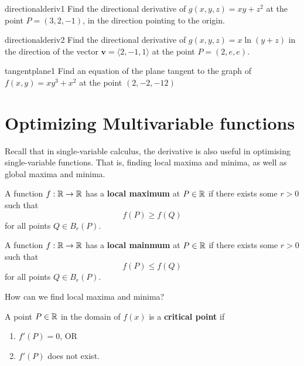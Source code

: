\begin{problem}{directionalderiv1}
    Find the directional derivative of $g(x,y,z) = xy+z^2$ at the point $P = (3,2,-1)$, in the direction pointing to the origin.
\end{problem}

\begin{problem}{directionalderiv2}
    Find the directional derivative of $g(x,y,z) = x\ln(y+z)$ in the direction of the vector $\bm{v} = \langle 2, -1, 1 \rangle$ at the point $P = (2,e,e)$.
\end{problem}


\begin{problem}{tangentplane1}
    Find an equation of the plane tangent to the graph of $f(x,y) = xy^3 + x^2$ at the point $(2,-2,-12)$
\end{problem}

\section{Optimizing Multivariable functions}

Recall that in single-variable calculus, the derivative is also useful in optimising single-variable functions.  That is, finding local maxima and minima, as well as global maxima and minima.  

\begin{definition}
    A function $f: \mathbb{R} \to \mathbb{R}$ has a \textbf{local maximum} at $P \in \mathbb{R}$ if there exists some $r>0$ such that
    $$f(P) \geq f(Q)$$
    for all points $Q \in B_r(P)$.
    \end{definition}

    \begin{definition}
    A function $f: \mathbb{R} \to \mathbb{R}$ has a \textbf{local mainmum} at $P \in \mathbb{R}$ if there exists some $r>0$ such that
    $$f(P) \leq f(Q)$$
    for all points $Q \in B_r(P)$.
    \end{definition}


\begin{motivating}
    How can we find local maxima and minima?
\end{motivating}

\begin{definition}
        A point $P \in \mathbb{R}$ in the domain of $f(x)$ is a \textbf{critical point} if
        
        \begin{enumerate}
            \item $f'(P) = 0$, OR
            \item $f'(P)$ does not exist.
        \end{enumerate}
        
    \end{definition}

